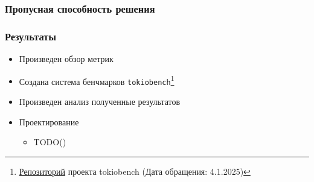 \documentclass{beamer}
\begin{document}
\begin{frame}[fragile]
  \frametitle{Пропусная способность решения}

\end{frame}

\begin{frame}[fragile]
  \frametitle{Результаты}
  \begin{itemize}
    \item Произведен обзор метрик
    \item Создана система бенчмарков \verb|tokiobench|\footnote{\href{https://github.com/IgorErin/tokiobench}{Репозиторий} проекта tokiobench (Дата обращения: 4.1.2025)}
    \item Произведен анализ полученные результатов
    \item Проектирование
    \begin{itemize}
      \item TODO()
    \end{itemize}
  \end{itemize}
\end{frame}

\end{document}
